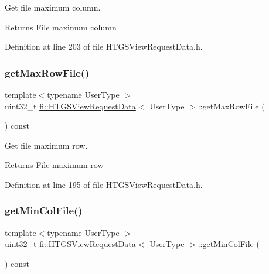 Get file maximum column. 

\begin{DoxyReturn}{Returns}
File maximum column 
\end{DoxyReturn}


Definition at line 203 of file H\+T\+G\+S\+View\+Request\+Data.\+h.

\mbox{\label{classfi_1_1HTGSViewRequestData_a2cfede2b1ca5e1f9dcbae4f8a66a46f8}} 
\subsubsection{\texorpdfstring{get\+Max\+Row\+File()}{getMaxRowFile()}}
{\footnotesize\ttfamily template$<$typename User\+Type $>$ \\
uint32\+\_\+t \hyperlink{classfi_1_1HTGSViewRequestData}{fi\+::\+H\+T\+G\+S\+View\+Request\+Data}$<$ User\+Type $>$\+::get\+Max\+Row\+File (\begin{DoxyParamCaption}{ }\end{DoxyParamCaption}) const\hspace{0.3cm}{\ttfamily [inline]}}



Get file maximum row. 

\begin{DoxyReturn}{Returns}
File maximum row 
\end{DoxyReturn}


Definition at line 195 of file H\+T\+G\+S\+View\+Request\+Data.\+h.

\mbox{\label{classfi_1_1HTGSViewRequestData_a363dec233a9e85a3271e365f891028ce}} 
\subsubsection{\texorpdfstring{get\+Min\+Col\+File()}{getMinColFile()}}
{\footnotesize\ttfamily template$<$typename User\+Type $>$ \\
uint32\+\_\+t \hyperlink{classfi_1_1HTGSViewRequestData}{fi\+::\+H\+T\+G\+S\+View\+Request\+Data}$<$ User\+Type $>$\+::get\+Min\+Col\+File (\begin{DoxyParamCaption}{ }\end{DoxyParamCaption}) const\hspace{0.3cm}{\ttfamily [inline]}}



